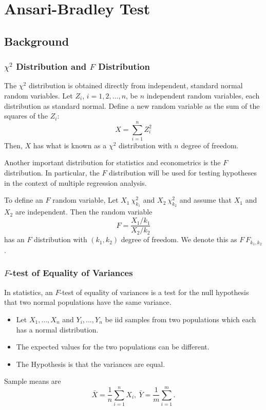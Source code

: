 \section{Ansari-Bradley Test}
\subsection{Background}
\subsubsection{$\chi^2$ Distribution and $F$ Distribution}
The $\chi^2$ distribution is obtained directly from independent, standard normal random variables. Let $Z_i$, $i = 1,2, \dots, n$, be $n$ independent random variables, each distribution as standard normal. Define a new random variable as the sum of the squares of the $Z_i$:
\[X = \sum_{i=1}^{n}Z_i^2\]
Then, $X$ has what is known as a $\chi^2$ distribution with $n$ degree of freedom.

Another important distribution for statistics and econometrics is the $F$ distribution. In particular, the $F$ distribution will be used for testing hypotheses in the context of multiple regression analysis.

To define an $F$ random variable, Let $X_1 ~ \chi_{k_1}^2$ and $X_2 ~ \chi_{k_2}^2$ and assume that $X_1$ and $X_2$ are independent. Then the random variable
\[F = \frac{X_1 / k_1}{X_2 / k_2}\]
has an $F$ distribution with $(k_1, k_2)$ degree of freedom. We denote this as $F ~ F_{k_1, k_2}$.
\subsubsection{$F$-test of Equality of Variances}
In statistics, an $F$-test of equality of variances is a test for the null hypothesis that two normal populations have the same variance. 

\begin{itemize}
	\item Let $X_1, \dots, X_n$ and $Y_i, \dots, Y_n$ be iid samples from two populations which each has a normal distribution.
	\item The expected values for the two populations can be different.
	\item The Hypothesis is that the variances are equal.
\end{itemize}

Sample means are 
\[\bar{X} = \frac{1}{n} \sum_{i = 1}^{n} X_i, ~\bar{Y} = \frac{1}{m} \sum_{i=1}^{m}.\]

